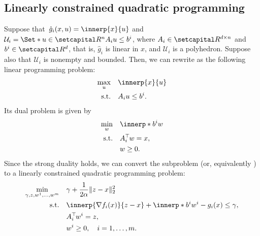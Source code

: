 \documentclass[../../main]{subfiles}
\begin{document}
\subsection{Linearly constrained quadratic programming} 
Suppose that~$\hat{g}_i (x,u) = \innerp{x}{u}$ and ${\mathcal{U}}_i = \Set*{ u \in \setR^n }{ A_i u \le b^i }$, where $A_i \in \setR^{d \times n}$ and $b^i \in \setR^d$, that is, $\hat{g}_i$ is linear in $x$, and $\mathcal{U}_i$ is a polyhedron. Suppose also that $\mathcal{U}_i$ is nonempty and bounded.
Then, we can rewrite  as the following linear programming problem:
\begin{align}\label{eq:lp}
    \begin{aligned}
        \max_u \quad & \innerp{x}{u}  \\
        \st    \quad & A_i u \le b^i.
    \end{aligned}
\end{align}
Its dual problem is given by
\begin{align}
    \begin{aligned}
        \min_w \quad & \innerp*{b^i}{w} \\
        \st    \quad & A_i^\T w = x,    \\
                     & w \geq 0.
    \end{aligned}
\end{align}
Since the strong duality holds, we can convert the subproblem  (or, equivalently ) to a linearly constrained quadratic programming problem:
\begin{align}\label{eq:qp}
    \begin{aligned}
        \min_{\gamma, z, w^1, \dots, w^m} \quad & \gamma + \frac{1}{2 \alpha}\norm{z - x}_2^2                             \\
        \st    \quad                            & \innerp{\nabla f_i(x)}{z - x} + \innerp*{b^i}{w^i} - g_i(x) \le \gamma, \\
                                                & A_i^\T w^i = z,                                                         \\
                                                & w^i \geq 0, \quad i = 1,\dots,m.
    \end{aligned}
\end{align}
\end{document}
